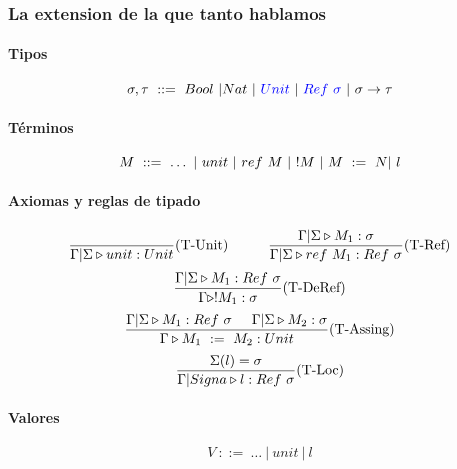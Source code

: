 \subsubsection{La extension de la que tanto hablamos}

\paragraph{Tipos}
$$\sigma, \tau ~::=~ Bool~|Nat~|~\color{blue}Unit\color{black}~|~\color{blue}Ref~\sigma\color{black}~|~\sigma\to\tau$$

\paragraph{Términos}

$$ M~::=~ \dots~|~unit~|~ref~M~|~!M~|~M~:=~N |~    l$$

\paragraph{Axiomas y reglas de tipado}
\begin{equation*}
\frac{}{\Gamma|\Sigma\triangleright unit : Unit}(\text{T-Unit})\hspace*{1cm}\frac{\Gamma|\Sigma\triangleright M_1 : \sigma}{\Gamma|\Sigma\triangleright ref~M_1 : Ref~\sigma}(\text{T-Ref})
\end{equation*}
\vspace*{5mm}
\begin{equation*}
\frac{\Gamma|\Sigma\triangleright M_1 : Ref~\sigma}{\Gamma\triangleright !M_1 : \sigma}(\text{T-DeRef})
\end{equation*}
\vspace*{5mm}
\begin{equation*}
\frac{\Gamma|\Sigma\triangleright M_1 : Ref~\sigma\hspace*{5mm}\Gamma|\Sigma\triangleright M_2 : \sigma}{\Gamma\triangleright M_1~:=~M_2 : Unit}(\text{T-Assing})
\end{equation*}
\vspace*{5mm}
\begin{equation*}
\frac{\Sigma(l) = \sigma}{\Gamma|Signa\triangleright l : Ref~\sigma}(\text{T-Loc})
\end{equation*}

\paragraph{Valores}
$$V~::=~\dots~|~unit~|~l$$

